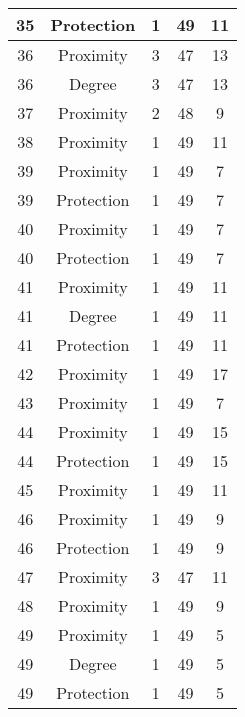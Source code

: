 \documentclass[results.tex]{subfiles}
\begin{document}
\begin{center}
\begin{tabular}{| c || c | c | c | c |}
    35 & Protection & 1 & 49 & 11 \\ 
    \hline
    36 & Proximity & 3 & 47 & 13 \\ 
    \hline
    36 & Degree & 3 & 47 & 13 \\ 
    \hline
    37 & Proximity & 2 & 48 & 9 \\ 
    \hline
    38 & Proximity & 1 & 49 & 11 \\ 
    \hline
    39 & Proximity & 1 & 49 & 7 \\ 
    \hline
    39 & Protection & 1 & 49 & 7 \\ 
    \hline
    40 & Proximity & 1 & 49 & 7 \\ 
    \hline
    40 & Protection & 1 & 49 & 7 \\ 
    \hline
    41 & Proximity & 1 & 49 & 11 \\ 
    \hline
    41 & Degree & 1 & 49 & 11 \\ 
    \hline
    41 & Protection & 1 & 49 & 11 \\ 
    \hline
    42 & Proximity & 1 & 49 & 17 \\ 
    \hline
    43 & Proximity & 1 & 49 & 7 \\ 
    \hline
    44 & Proximity & 1 & 49 & 15 \\ 
    \hline
    44 & Protection & 1 & 49 & 15 \\ 
    \hline
    45 & Proximity & 1 & 49 & 11 \\ 
    \hline
    46 & Proximity & 1 & 49 & 9 \\ 
    \hline
    46 & Protection & 1 & 49 & 9 \\ 
    \hline
    47 & Proximity & 3 & 47 & 11 \\ 
    \hline
    48 & Proximity & 1 & 49 & 9 \\ 
    \hline
    49 & Proximity & 1 & 49 & 5 \\ 
    \hline
    49 & Degree & 1 & 49 & 5 \\ 
    \hline
    49 & Protection & 1 & 49 & 5 \\ 
    \hline   \end{tabular}
\end{center}
\end{document}
